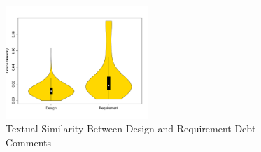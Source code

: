 \begin{figure}[t]
  \centering
  \includegraphics[width = 0.48\textwidth]{figures/textual_similarity_removing_stop_words.pdf}
  \vspace{-3mm}
  \caption{Textual Similarity Between Design and Requirement Debt Comments}
  \label{fig:textual_similarity}
\end{figure}

